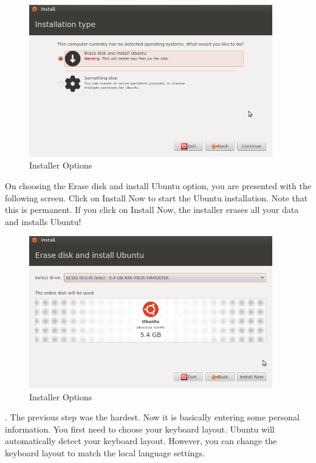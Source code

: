 \begin{figure}[!h]	
	\begin{center}
	\includegraphics[width=300pt]{./images/installation/installer-os-options.png}
	\caption{Installer Options}	
	\label{fig:installer-prepare}	
	\end{center}
\end{figure}

\par \noindent On choosing the Erase disk and install Ubuntu option, you are presented with the following screen. Click on Install Now to start the Ubuntu installation. Note that this is permanent. If you click on Install Now, the installer erases all your data and installs Ubuntu! \\

\begin{figure}[!h]	
	\begin{center}
	\includegraphics[width=300pt]{./images/installation/installer-onlyubuntu.png}
	\caption{Installer Options}	
	\label{fig:installer-onlyubuntu}	
	\end{center}
\end{figure}

\newpage
\par {}. The previous step was the hardest. Now it is basically entering some personal information. You first need to choose your keyboard layout. Ubuntu will automatically detect your keyboard layout. However, you can change the keyboard layout to match the local language settings. \\


